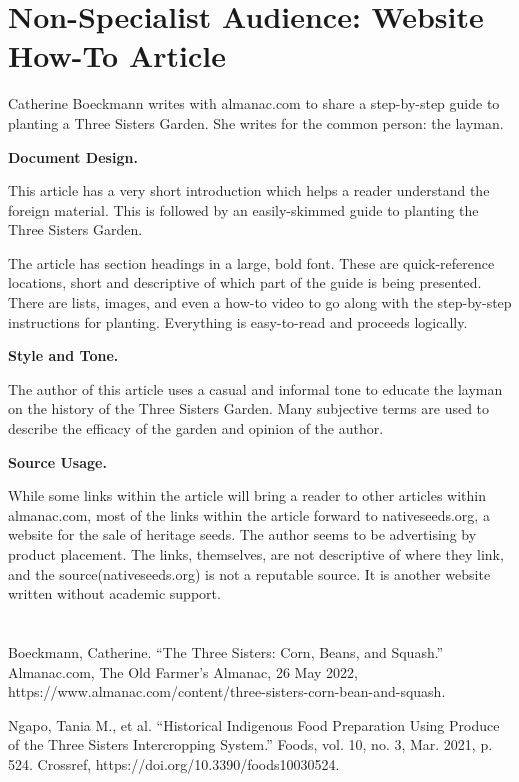 \documentclass[12pt,a4paper,english]{article}
\begin{document}
\begin{flushleft}
\section*{Non-Specialist Audience: Website How-To Article}
Catherine Boeckmann writes with almanac.com to share a step-by-step guide to planting a Three Sisters Garden. She writes for the common person: the layman.
\par

\textbf{Document Design.} %
\par
This article has a very short introduction which helps a reader understand the foreign material. This is followed by an easily-skimmed guide to planting the Three Sisters Garden. 
\par
The article has section headings in a large, bold font. These are quick-reference locations, short and descriptive of which part of the guide is being presented. There are lists, images, and even a how-to video to go along with the step-by-step instructions for planting. Everything is easy-to-read and proceeds logically.

\textbf{Style and Tone.} %
\par
The author of this article uses a casual and informal tone to educate the layman on the history of the Three Sisters Garden. Many subjective terms are used to describe the efficacy of the garden and opinion of the author.
\par

\textbf{Source Usage.} %
\par
While some links within the article will bring a reader to other articles within almanac.com, most of the links within the article forward to nativeseeds.org, a website for the sale of heritage seeds. The author seems to be advertising by product placement. The links, themselves, are not descriptive of where they link, and the source(nativeseeds.org) is not a reputable source. It is another website written without academic support.
\pagebreak

\section*{}
\begin{hangparas}{2em}{1}
  Boeckmann, Catherine. “The Three Sisters: Corn, Beans, and Squash.” Almanac.com, The Old Farmer's Almanac, 26 May 2022, https://www.almanac.com/content/three-sisters-corn-bean-and-squash. 
  \par
  Ngapo, Tania M., et al. “Historical Indigenous Food Preparation Using Produce of the Three Sisters Intercropping System.” Foods, vol. 10, no. 3, Mar. 2021, p. 524. Crossref, https://doi.org/10.3390/foods10030524.
\end{hangparas}
\end{flushleft}
\end{document}
